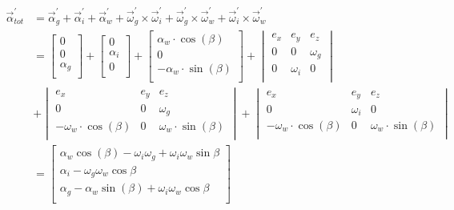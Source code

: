\begin{equation}
\begin{split}
\vec{\alpha}_{tot}^{'} &= \vec{\alpha}_{g}^{'} + \vec{\alpha}_{i}^{'} + \vec{\alpha}_{w}^{'} + \vec{\omega}_{g}^{'} \times \vec{\omega}_{i}^{'} + \vec{\omega}_{g}^{'} \times \vec{\omega}_{w}^{'} + \vec{\omega}_{i}^{'} \times \vec{\omega}_{w}^{'}\\
&=\begin{bmatrix}
0						\\
0						\\
\alpha_{g}	\\
\end{bmatrix}
+\begin{bmatrix}
0						\\
\alpha_{i}	\\
0						\\
\end{bmatrix}
+\begin{bmatrix}
\alpha_{w}\cdot \cos(\beta)	\\
0						\\
-\alpha_{w}\cdot \sin(\beta)	\\
\end{bmatrix}
+\begin{vmatrix}
e_{x}&e_{y}&e_{z}\\
0&0&\omega_{g}\\
0&\omega_{i}&0\\
\end{vmatrix}\\
&+\begin{vmatrix}
e_{x}&e_{y}&e_{z}\\
0&0&\omega_{g}\\
-\omega_{w}\cdot \cos(\beta)&0&\omega_{w}\cdot \sin(\beta)\\
\end{vmatrix}
+\begin{vmatrix}
e_{x}&e_{y}&e_{z}\\
0&\omega_{i}&0\\
-\omega_{w}\cdot \cos(\beta)&0&\omega_{w}\cdot \sin(\beta)\\
\end{vmatrix}\\
&=\begin{bmatrix}
\alpha_{w}\cos(\beta)-\omega_{i}\omega_{g}+\omega_{i}\omega_{w}\sin{\beta}\\
\alpha_{i}-\omega_{g}\omega_{w}\cos{\beta}\\
\alpha_{g}-	\alpha_{w} \sin(\beta)+\omega_{i}\omega_{w}\cos{\beta}\\
\end{bmatrix}
\label{eq:kin1.8}
\end{split}
\end{equation}
